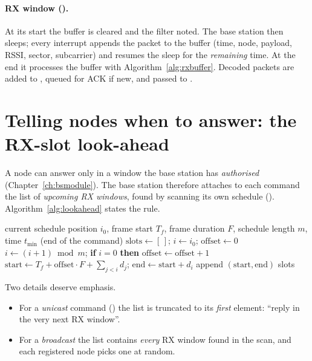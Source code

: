 \paragraph{RX window ().} At its start the buffer is cleared and the  filter noted. The base station then sleeps; every  interrupt appends the packet to the buffer (time, node, payload, RSSI, sector, subcarrier) and resumes the sleep for the \emph{remaining} time. At the end it processes the buffer with Algorithm~\ref{alg:rxbuffer}. Decoded packets are added to , queued for ACK if new, and passed to .

\section{Telling nodes when to answer: the RX-slot look-ahead}
\label{sec:lookahead}

A node can answer only in a window the base station has \emph{authorised} (Chapter~\ref{ch:bsmodule}). The base station therefore attaches to each command the list of \emph{upcoming RX windows}, found by scanning its own schedule (). Algorithm~\ref{alg:lookahead} states the rule.

\begin{algorithm}[t]
\caption{RX-slot look-ahead ()}
\label{alg:lookahead}
\begin{algorithmic}[1]
\Require current schedule position $i_0$, frame start $T_f$, frame duration $F$, schedule length $m$, time $t_{\min}$ (end of the command)
\State $\mathrm{slots}\gets[\,]$; \quad $i\gets i_0$; \quad $\mathrm{offset}\gets0$
 
   \State $i\gets(i+1)\bmod m$; \quad \textbf{if} $i=0$ \textbf{then} $\mathrm{offset}\gets\mathrm{offset}+1$
   \State $\mathrm{start}\gets T_f+\mathrm{offset}\cdot F+\sum_{j<i}d_j$; \quad $\mathrm{end}\gets\mathrm{start}+d_i$
    append $(\mathrm{start},\mathrm{end})$ \EndIf
\EndFor
\State \Return slots
\end{algorithmic}
\end{algorithm}

Two details deserve emphasis.
\begin{itemize}
 \item For a \emph{unicast} command () the list is truncated to its \emph{first} element: ``reply in the very next RX window''.
 \item For a \emph{broadcast} the list contains \emph{every} RX window found in the scan, and each registered node picks one at random.
\end{itemize}


